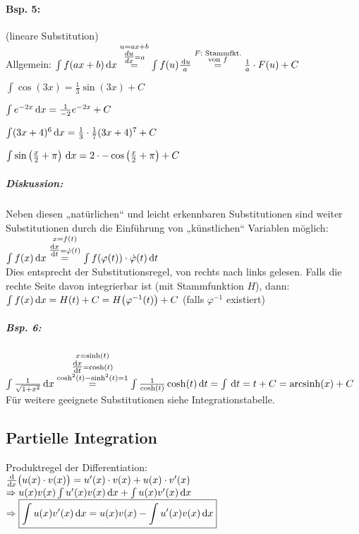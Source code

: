 \paragraph{Bsp. 5:}(lineare Substitution)\\
Allgemein: $\int f(ax+b) \,\mathrm{d}x \overset{\substack{u=ax+b\\\tfrac{du}{dx}=a}}{=} \int f(u) \frac{\,\mathrm{d}u}{a}\overset{\substack{F: \text{ Stammfkt.}\\ \text{von } f}}{=}\frac{1}{a}\cdot F(u) + C$
\begin{anumerate}
\item $\int \cos (3x) = \frac{1}{3}\sin (3x) + C$
\item $\int e^{-2x} \,\mathrm{d}x=\frac{1}{-2}e^{-2x}+C$
\item $\int (3x+4)^6 \,\mathrm{d}x=\frac{1}{3}\cdot \frac{1}{7}(3x+4)^7+C$
\item $\int \sin \left( \frac{x}{2}+\pi\right) \,\mathrm{d}x=2 \cdot  -\cos\left(\frac{x}{2}+\pi\right)+C$
\end{anumerate}

\subparagraph{Diskussion:} Neben diesen „natürlichen“ und leicht erkennbaren Substitutionen sind weiter Substitutionen durch die Einführung von „künstlichen“ Variablen möglich:\\
$\int f(x) \,\mathrm{d}x\overset{\substack{x=f(t)\\\tfrac{\mathrm{d}x}{\mathrm{d}t}=\dot{\varphi}(t)}}{=}\int f(\varphi(t)) \cdot \dot{\varphi}(t) \,\mathrm{d}t$\\
Dies entsprecht der Substitutionsregel, von rechts nach links gelesen. Falls die rechte Seite davon integrierbar ist (mit Stammfunktion $H$), dann:\\
$\int f(x) \,\mathrm{d}x=H(t) + C = H\big(\varphi^{-1}(t)\big) + C$ \qquad (falls $\varphi^{-1}$ existiert)
\subparagraph{Bsp. 6:} \parskp
$\int \frac{1}{\sqrt{1+x^2}}\,\mathrm{d}x\overset{\substack{x=\sinh(t)\\\tfrac{\mathrm{d}x}{\mathrm{d}t}=\cosh(t)\\\cosh^2(t)-\sinh^2(t)=1}}{=}\int \frac{1}{\cosh(t)}\cosh(t)\,\mathrm{d}t=\int \,\mathrm{d}t=t+C = \operatorname{arcsinh} (x) + C$\\
Für weitere geeignete Substitutionen siehe Integrationstabelle.

\subsection{Partielle Integration}
Produktregel der Differentiation:\\
$\frac{\mathrm{d}}{\mathrm{d}x}\big(u(x)\cdot v(x)\big) = u'(x)\cdot v(x)+u(x)\cdot v'(x)$\\
$\Rightarrow u(x) v(x) \int u'(x) v(x) \,\mathrm{d}x + \int u(x) v'(x) \,\mathrm{d}x$\\
$\Rightarrow \boxed{\int u(x)v'(x)\,\mathrm{d}x=u(x)v(x)- \int u'(x) v(x) \,\mathrm{d}x }$

